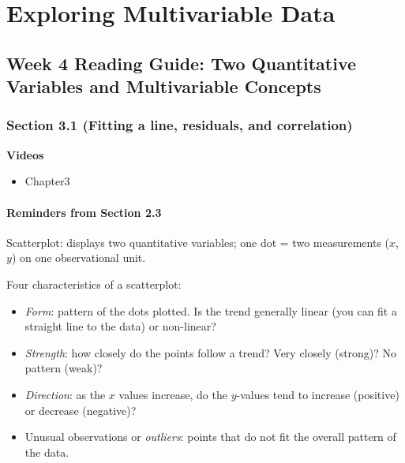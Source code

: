 \documentclass[
]{report}
\providecommand{\tightlist}{%
  \setlength{\itemsep}{0pt}\setlength{\parskip}{0pt}}
\begin{document}
\newpage

\hypertarget{exploring-multivariable-data}{%
\chapter{Exploring Multivariable Data}\label{exploring-multivariable-data}}

\hypertarget{week-4-reading-guide-two-quantitative-variables-and-multivariable-concepts}{%
\section{Week 4 Reading Guide: Two Quantitative Variables and Multivariable Concepts}\label{week-4-reading-guide-two-quantitative-variables-and-multivariable-concepts}}

\hypertarget{section-3.1-fitting-a-line-residuals-and-correlation}{%
\subsection*{Section 3.1 (Fitting a line, residuals, and correlation)}\label{section-3.1-fitting-a-line-residuals-and-correlation}}


\textbf{Videos}

\begin{itemize}
\tightlist
\item
  Chapter3
\end{itemize}


\hypertarget{reminders-from-section-2.3}{%
\subsubsection*{Reminders from Section 2.3}\label{reminders-from-section-2.3}}

Scatterplot: displays two quantitative variables; one dot = two measurements (\(x\), \(y\)) on one observational unit.

Four characteristics of a scatterplot:

\begin{itemize}
\tightlist
\item
  \emph{Form}: pattern of the dots plotted. Is the trend generally linear (you can fit a straight line to the data) or non-linear?\\
\item
  \emph{Strength}: how closely do the points follow a trend? Very closely (strong)? No pattern (weak)?\\
\item
  \emph{Direction}: as the \(x\) values increase, do the \(y\)-values tend to increase (positive) or decrease (negative)?\\
\item
  Unusual observations or \emph{outliers}: points that do not fit the overall pattern of the data.
\end{itemize}
\end{document}
